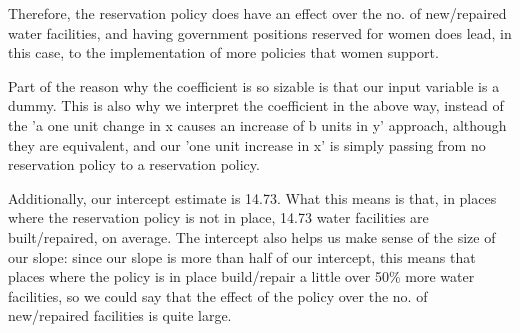 \documentclass[12pt,letterpaper]{article}
\begin{document}
\begin{enumerate}
	Therefore, the reservation policy does have an effect over the no. of new/repaired water facilities, and having government positions reserved for women does lead, in this case, to the implementation of more policies that women support. 
	
	Part of the reason why the coefficient is so sizable is that our input variable is a dummy. This is also why we interpret the coefficient in the above way, instead of the 'a one unit change in x causes an increase of b units in y' approach, although they are equivalent, and our 'one unit increase in x' is simply passing from no reservation policy to a reservation policy. 
	
	Additionally, our intercept estimate is 14.73. What this means is that, in places where the reservation policy is not in place, 14.73 water facilities are built/repaired, on average. The intercept also helps us make sense of the size of our slope: since our slope is more than half of our intercept, this means that places where the policy is in place build/repair a little over 50\% more water facilities, so we could say that the effect of the policy over the no. of new/repaired facilities is quite large. 
	
\end{enumerate}
\end{document}
